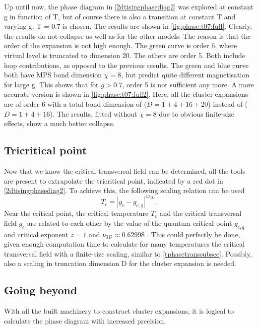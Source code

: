 Up until now, the phase diagram in \cref{2dtisingphasediag2} was explored at constant g in function of T, but of course there is also a transition at constant T and varying g.  T = 0.7 is chosen. The results are shown in \cref{fig:phase:t07:full}. Clearly, the results do not collapse as well as for the other models. The reason is that the order of the expansion is not high enough. The green curve is order 6, where virtual level is truncated to dimension 20. The others are order 5. Both include loop contributions, as opposed to the previous results. The green and blue curve both have \Gls{MPS} bond dimension $\chi=8$, but predict quite different magnetisation for large g. This shows that for $g>0.7$, order 5 is not sufficient any more.
A more accurate version is shown in \cref{fig:phase:t07:full2}. Here, all the cluster expansions are of order 6 with a total bond dimension of ($D = 1+4+16+20$) instead of ($D = 1+4+16$). The results, fitted without $\chi=8$ due to obvious finite-size effects, show a much better collapse.

\subsection{Tricritical point}\label{subsec:tricrit}

Now that we know the critical transversal field can be determined, all the tools are present to extrapolate the tricritical point, indicated by a red dot in \cref{2dtisingphasediag2}. To achieve this, the following scaling relation can be used
\begin{equation}
    T_c = \left| g_c-g_{c,q} \right|^{z \nu_{3D}} .
\end{equation}
Near the critical point, the critical temperature $T_c$ and the critical transversal field $g_c$ are related to each other by the value of the quantum critical point $g_{c,q}$ and critical exponent $z=1$ and $\nu_{3D} \approx 0.62998$ \cite{Hesselmann2016}. This could perfectly be done, given enough computation time to calculate for many temperatures the critical transversal field with a finite-size scaling, similar to \cref{tphasetranssubsec}. Possibly, also a scaling in truncation dimension D for the cluster expansion is needed.

\subsection{Going beyond}
With all the built machinery to construct cluster expansions, it is logical to calculate the phase diagram with increased precision.

